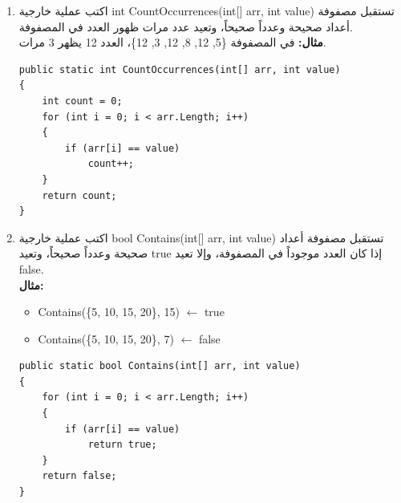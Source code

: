 \documentclass[14pt]{extarticle}
\begin{document}
\begin{enumerate}[resume, itemsep=2em]
    \item
    اكتب عملية خارجية \textenglish{int CountOccurrences(int[] arr, int value)} تستقبل مصفوفة أعداد صحيحة وعدداً صحيحاً، وتعيد عدد مرات ظهور العدد في المصفوفة.\\
    \textbf{مثال:} في المصفوفة \textenglish{\{5, 12, 8, 12, 3, 12\}}، العدد 12 يظهر 3 مرات.
    \ifwithsols
    \begin{boxSolution}
    \begin{english}
    \begin{verbatim}
public static int CountOccurrences(int[] arr, int value)
{
    int count = 0;
    for (int i = 0; i < arr.Length; i++)
    {
        if (arr[i] == value)
            count++;
    }
    return count;
}
    \end{verbatim}
    \end{english}
    \end{boxSolution}
    \fi

    \item
    اكتب عملية خارجية \textenglish{bool Contains(int[] arr, int value)} تستقبل مصفوفة أعداد صحيحة وعدداً صحيحاً، وتعيد \textenglish{true} إذا كان العدد موجوداً في المصفوفة، وإلا تعيد \textenglish{false}.\\
    \textbf{مثال:}
    \begin{itemize}
        \item \textenglish{Contains(\{5, 10, 15, 20\}, 15)} $\leftarrow$ \textenglish{true}
        \item \textenglish{Contains(\{5, 10, 15, 20\}, 7)} $\leftarrow$ \textenglish{false}
    \end{itemize}
    \ifwithsols
    \begin{boxSolution}
    \begin{english}
    \begin{verbatim}
public static bool Contains(int[] arr, int value)
{
    for (int i = 0; i < arr.Length; i++)
    {
        if (arr[i] == value)
            return true;
    }
    return false;
}
    \end{verbatim}
    \end{english}
    \end{boxSolution}
    \fi


\end{enumerate}
\end{document}
